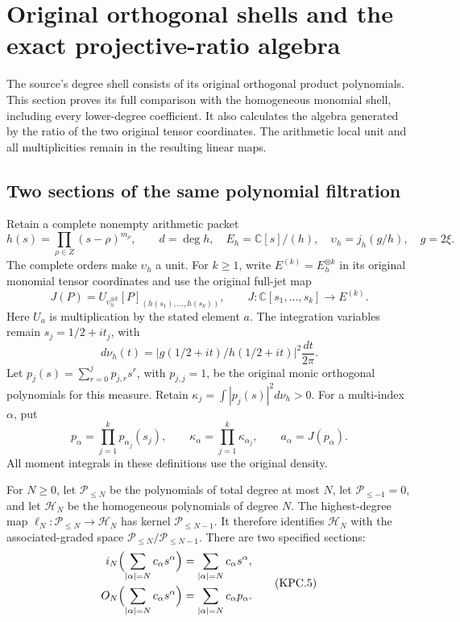 \section{Original orthogonal shells and the exact projective-ratio algebra}
\label{sec:kernel-layer-projective-comparison}

The source's degree shell consists of its original orthogonal product
polynomials.  This section proves its full comparison with the
homogeneous monomial shell, including every lower-degree coefficient.
It also calculates the algebra generated by the ratio of the two
original tensor coordinates.  The arithmetic local unit and all
multiplicities remain in the resulting linear maps.

\subsection{Two sections of the same polynomial filtration}

Retain a complete nonempty arithmetic packet
\[
 h(s)=\prod_{\rho\in Z}(s-\rho)^{m_\rho},\qquad
 d=\deg h,\quad E_h=\mathbb C[s]/(h),\quad
 \upsilon_h=j_h(g/h),\quad g=2\xi.
 \tag{KPC.1}
\]
The complete orders make \(\upsilon_h\) a unit.  For \(k\ge1\),
write \(E^{(k)}=E_h^{\otimes k}\) in its original monomial
tensor coordinates and use the original full-jet map
\[
 J(P)=U_{\upsilon_h^{\otimes k}}
       [P]_{(h(s_1),\ldots,h(s_k))},
 \qquad J:\mathbb C[s_1,\ldots,s_k]\longrightarrow E^{(k)}.
 \tag{KPC.2}
\]
Here \(U_a\) is multiplication by the stated element \(a\).
The integration variables remain \(s_j=1/2+it_j\), with
\[
 d\nu_h(t)=|g(1/2+it)/h(1/2+it)|^2\frac{dt}{2\pi}.
 \tag{KPC.3}
\]
Let \(p_j(s)=\sum_{r=0}^j p_{j,r}s^r\), with
\(p_{j,j}=1\), be the original monic orthogonal polynomials
for this measure.  Retain
\(\kappa_j=\int|p_j(s)|^2d\nu_h>0\).
For a multi-index \(\alpha\), put
\[
 p_\alpha=\prod_{j=1}^k p_{\alpha_j}(s_j),\qquad
 \kappa_\alpha=\prod_{j=1}^k\kappa_{\alpha_j},\qquad
 a_\alpha=J(p_\alpha).
 \tag{KPC.4}
\]
All moment integrals in these definitions use the original density.

For \(N\ge0\), let \(\mathcal P_{\le N}\) be the polynomials
of total degree at most \(N\), let
\(\mathcal P_{\le-1}=0\), and let \(\mathcal H_N\) be the
homogeneous polynomials of degree \(N\).  The highest-degree map
\(\ell_N:\mathcal P_{\le N}\to\mathcal H_N\) has kernel
\(\mathcal P_{\le N-1}\).  It therefore identifies
\(\mathcal H_N\) with the associated-graded space
\(\mathcal P_{\le N}/\mathcal P_{\le N-1}\).
There are two specified sections:
\[
 \begin{split}
 i_N\Bigl(\sum_{|\alpha|=N}c_\alpha s^\alpha\Bigr)
       &=\sum_{|\alpha|=N}c_\alpha s^\alpha,\\
 O_N\Bigl(\sum_{|\alpha|=N}c_\alpha s^\alpha\Bigr)
       &=\sum_{|\alpha|=N}c_\alpha p_\alpha.
 \end{split}                                                    \tag{KPC.5}
\]

